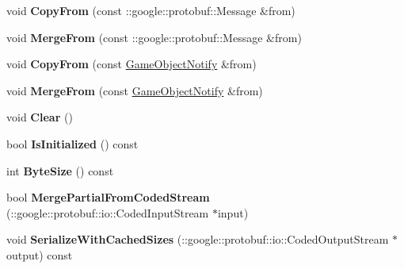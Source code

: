 \begin{DoxyCompactItemize}
\item 
\hypertarget{class_game_object_notify_a45a598344fda5647816ed6bba5b94c95}{void {\bfseries Copy\-From} (const \-::google\-::protobuf\-::\-Message \&from)}\label{class_game_object_notify_a45a598344fda5647816ed6bba5b94c95}

\item 
\hypertarget{class_game_object_notify_af2604fb22741c6304ee689d8de537075}{void {\bfseries Merge\-From} (const \-::google\-::protobuf\-::\-Message \&from)}\label{class_game_object_notify_af2604fb22741c6304ee689d8de537075}

\item 
\hypertarget{class_game_object_notify_af163bd4f2834c44583ad22ff80c5fa34}{void {\bfseries Copy\-From} (const \hyperlink{class_game_object_notify}{Game\-Object\-Notify} \&from)}\label{class_game_object_notify_af163bd4f2834c44583ad22ff80c5fa34}

\item 
\hypertarget{class_game_object_notify_a185bd7dc2f070e9e98fa12158d160dad}{void {\bfseries Merge\-From} (const \hyperlink{class_game_object_notify}{Game\-Object\-Notify} \&from)}\label{class_game_object_notify_a185bd7dc2f070e9e98fa12158d160dad}

\item 
\hypertarget{class_game_object_notify_a7f116fae390b87419a829241f6ea0197}{void {\bfseries Clear} ()}\label{class_game_object_notify_a7f116fae390b87419a829241f6ea0197}

\item 
\hypertarget{class_game_object_notify_a4a821d184827fdafccab3a697dc666c6}{bool {\bfseries Is\-Initialized} () const }\label{class_game_object_notify_a4a821d184827fdafccab3a697dc666c6}

\item 
\hypertarget{class_game_object_notify_a63635477dec6ef117cc2e20e9a9f55dd}{int {\bfseries Byte\-Size} () const }\label{class_game_object_notify_a63635477dec6ef117cc2e20e9a9f55dd}

\item 
\hypertarget{class_game_object_notify_aaa19ace0d7b2ce545036315be7509456}{bool {\bfseries Merge\-Partial\-From\-Coded\-Stream} (\-::google\-::protobuf\-::io\-::\-Coded\-Input\-Stream $\ast$input)}\label{class_game_object_notify_aaa19ace0d7b2ce545036315be7509456}

\item 
\hypertarget{class_game_object_notify_a7995608370fc8c5c03a9358a9efbfa85}{void {\bfseries Serialize\-With\-Cached\-Sizes} (\-::google\-::protobuf\-::io\-::\-Coded\-Output\-Stream $\ast$output) const }\label{class_game_object_notify_a7995608370fc8c5c03a9358a9efbfa85}


\end{DoxyCompactItemize}
